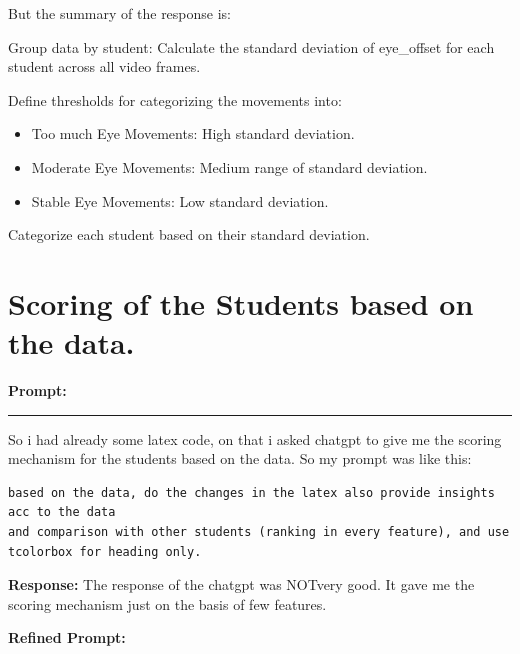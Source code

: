 \documentclass[11pt,a4paper]{article}
\begin{document}
\begin{itemize}
{\begin{tcolorbox}[title=response]
    But the summary of the response is:
    \begin{enumerate}
        \item Group data by student: Calculate the standard deviation of eye_offset for each student across all video frames.
        \item Define thresholds for categorizing the movements into:{
            \begin{itemize}
                \item Too much Eye Movements: High standard deviation.
                \item Moderate Eye Movements: Medium range of standard deviation.
                \item Stable Eye Movements: Low standard deviation.
            \end{itemize}
        \item Categorize each student based on their standard deviation.
        }
    \end{enumerate}

\end{tcolorbox}
    
        }
    \end{itemize}

  
\section{Scoring of the Students based on the data.}
\textbf{Prompt:}
\begin{center}
    \color{red}\rule{1\linewidth}{0.5mm}
\end{center}
\large{So i had already some latex code, on that i asked chatgpt to give me the scoring mechanism for the students based on the data.}
\Large{So my prompt was like this:}

\begin{tcolorbox}[title= response]
    \begin{lstlisting}
based on the data, do the changes in the latex also provide insights acc to the data 
and comparison with other students (ranking in every feature), and use tcolorbox for heading only.
    \end{lstlisting}
\end{tcolorbox}
\textbf{Response:}
\large{The response of the chatgpt was NOTvery good. It gave me the scoring mechanism just on the basis of few features.}


\textbf{Refined Prompt:}
\end{document}
